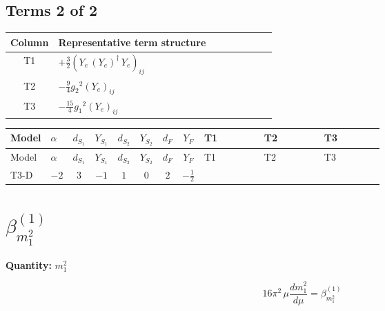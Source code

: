 \documentclass[8pt]{article}
\begin{document}
\begin{landscape}
\subsection*{Terms 2 of 2}
\begin{center}
\begin{tabular}{@{}c >{\raggedright\arraybackslash}p{0.82\linewidth}@{}}
\toprule
Column & Representative term structure \\
\midrule
T1 & \(\displaystyle +\frac{3}{2} \left({Y_e}\,\left({Y_e}\right)^{\dagger}\,{Y_e}\right)_{ij}\) \\
\midrule
T2 & \(\displaystyle -\frac{9}{4} {g_2}^2 \left({Y_e}\right)_{ij}\) \\
\midrule
T3 & \(\displaystyle -\frac{15}{4} {g_1}^2 \left({Y_e}\right)_{ij}\) \\
\midrule
\bottomrule
\end{tabular}
\end{center}
\smallskip
\tiny
\begin{longtable}{@{}llcccccc >{\raggedright\arraybackslash}p{0.21\linewidth} >{\raggedright\arraybackslash}p{0.21\linewidth} >{\raggedright\arraybackslash}p{0.21\linewidth}@{}}
\toprule
Model & $\alpha$ & $d_{S_1}$ & $Y_{S_1}$ & $d_{S_2}$ & $Y_{S_2}$ & $d_F$ & $Y_F$ & T1 & T2 & T3 \\
\midrule
\endfirsthead
\toprule
Model & $\alpha$ & $d_{S_1}$ & $Y_{S_1}$ & $d_{S_2}$ & $Y_{S_2}$ & $d_F$ & $Y_F$ & T1 & T2 & T3 \\
\midrule
\endhead
T3-D & $-2$ & $3$ & $-1$ & $1$ & $0$ & $2$ & $-\frac{1}{2}$ & \scriptsize\adjustbox{max width=\linewidth}{$\begin{gathered} +\frac{3}{2} \left({Y_e}\,\left({Y_e}\right)^{\dagger}\,{Y_e}\right)_{ij}\end{gathered}$} & \scriptsize\adjustbox{max width=\linewidth}{$\begin{gathered} -\frac{9}{4} {g_2}^2 \left({Y_e}\right)_{ij}\end{gathered}$} & \scriptsize\adjustbox{max width=\linewidth}{$\begin{gathered} -\frac{15}{4} {g_1}^2 \left({Y_e}\right)_{ij}\end{gathered}$} \\
\midrule
\bottomrule
\end{longtable}
\clearpage
\section*{$\beta_{m_1^2}^{(1)}$}
\noindent\textbf{Quantity: }$m_1^2$\par\smallskip
\[16\pi^2\,\mu\frac{d m_1^2}{d\mu}=\beta_{m_1^2}^{(1)}\]

\end{landscape}
\end{document}
